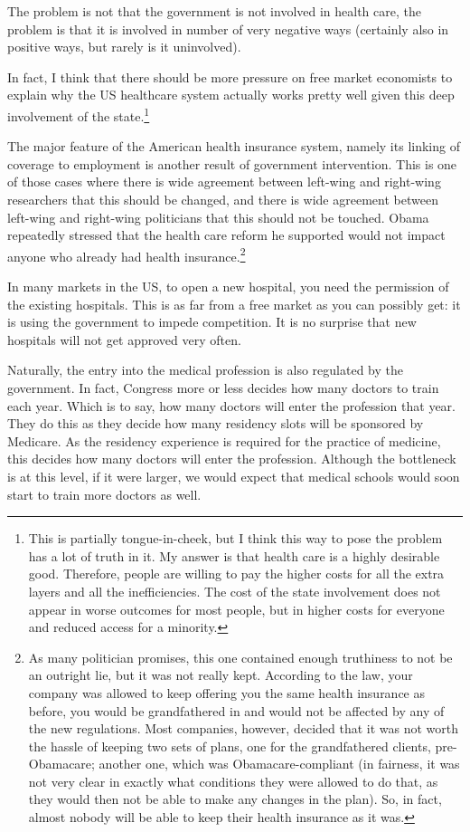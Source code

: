 The problem is not that the government is not involved in health care, the
problem is that it is involved in number of very negative ways (certainly also
in positive ways, but rarely is it uninvolved).

In fact, I think that there should be more pressure on free market economists
to explain why the US healthcare system actually works pretty well given this
deep involvement of the state.\footnote{This is partially tongue-in-cheek, but
I think this way to pose the problem has a lot of truth in it. My answer is
that health care is a highly desirable good. Therefore, people are willing to
pay the higher costs for all the extra layers and all the inefficiencies. The
cost of the state involvement does not appear in worse outcomes for most
people, but in higher costs for everyone and reduced access for a minority.}

The major feature of the American health insurance system, namely its linking
of coverage to employment is another result of government intervention. This is
one of those cases where there is wide agreement between left-wing and
right-wing researchers that this should be changed, and there is wide agreement
between left-wing and right-wing politicians that this should not be touched.
Obama repeatedly stressed that the health care reform he supported would not
impact anyone who already had health insurance.\footnote{As many politician
promises, this one contained enough truthiness to not be an outright lie, but
it was not really kept. According to the law, your company was allowed to keep
offering you the same health insurance as before, you would be grandfathered in
and would not be affected by any of the new regulations. Most companies,
however, decided that it was not worth the hassle of keeping two sets of plans,
one for the grandfathered clients, pre-Obamacare; another one,
which was Obamacare-compliant (in fairness, it was not very clear in exactly
what conditions they were allowed to do that, as they would then not be able to
make any changes in the plan). So, in fact, almost nobody will be able to keep
their health insurance as it was.}

In many markets in the US, to open a new hospital, you need the permission of
the existing hospitals. This is as far from a free market as you can possibly
get: it is using the government to impede competition. It is no surprise that
new hospitals will not get approved very often.

Naturally, the entry into the medical profession is also regulated by the
government. In fact, Congress more or less decides how many doctors to train
each year. Which is to say, how many doctors will enter the profession that
year. They do this as they decide how many residency slots will be sponsored by
Medicare. As the residency experience is required for the practice of medicine,
this decides how many doctors will enter the profession. Although the
bottleneck is at this level, if it were larger, we would expect that medical
schools would soon start to train more doctors as well.

